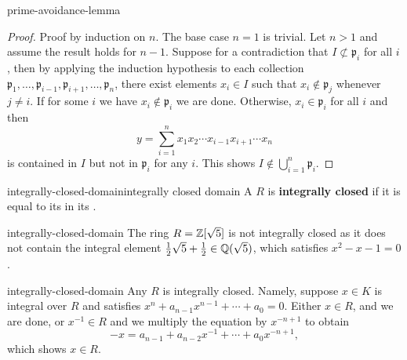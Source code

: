 \begin{example}{prime-avoidance-lemma}
    \begin{proof}
        Proof by induction on $n$. The base case $n = 1$ is trivial. Let $n > 1$ and assume the result holds for $n - 1$. Suppose for a contradiction that $I \not\subset \mathfrak{p}_i$ for all $i$, then by applying the induction hypothesis to each collection $\mathfrak{p}_1, \ldots, \mathfrak{p}_{i - 1}, \mathfrak{p}_{i + 1}, \ldots, \mathfrak{p}_n$, there exist elements $x_i \in I$ such that $x_i \not\in \mathfrak{p}_j$ whenever $j \ne i$. If for some $i$ we have $x_i \not\in \mathfrak{p}_i$ we are done. Otherwise, $x_i \in \mathfrak{p}_i$ for all $i$ and then
        \[ y = \sum_{i = 1}^{n} x_1 x_2 \cdots x_{i - 1} x_{i + 1} \cdots x_n \]
        is contained in $I$ but not in $\mathfrak{p}_i$ for any $i$. This shows $I \not\in \bigcup_{i = 1}^{n} \mathfrak{p}_i$.
    \end{proof}
\end{example}

\begin{topic}{integrally-closed-domain}{integrally closed domain}
    A  $R$ is \textbf{integrally closed} if it is equal to its  in its .
\end{topic}

\begin{example}{integrally-closed-domain}
    The ring $R = \mathbb{Z}[\sqrt{5}]$ is not integrally closed as it does not contain the integral element $\tfrac{1}{2} \sqrt{5} + \tfrac{1}{2} \in \mathbb{Q}(\sqrt{5})$, which satisfies $x^2 - x - 1 = 0$.
\end{example}

\begin{example}{integrally-closed-domain}
    Any  $R$ is integrally closed. Namely, suppose $x \in K$ is integral over $R$ and satisfies $x^n + a_{n - 1} x^{n - 1} + \cdots + a_0 = 0$. Either $x \in R$, and we are done, or $x^{-1} \in R$ and we multiply the equation by $x^{-n + 1}$ to obtain
    \[ -x = a_{n - 1} + a_{n - 2} x^{-1} + \cdots + a_0 x^{-n + 1} , \]
    which shows $x \in R$.
\end{example}

